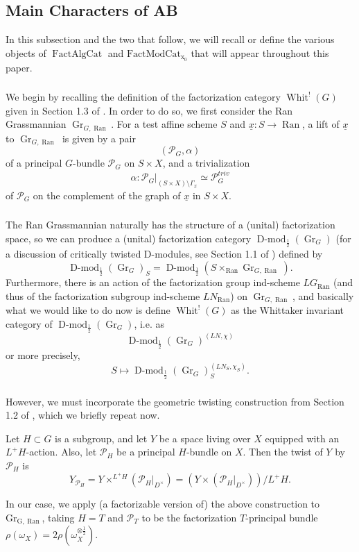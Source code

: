 \documentclass[10pt]{amsart}
\theoremstyle{remark}
\newcommand{\on}[1]{\operatorname{#1}}
\newcommand{\Dmod}{\on{D-mod}}
\newcommand{\FactAlgCat}{\on{FactAlgCat}}
\newcommand{\FactModCat}{\on{FactModCat_{x_0}}}
\newcommand{\sssec}[1]{\subsubsection{}}
\begin{document}
\subsection{Main Characters of AB} \label{Main Characters of AB}
In this subsection and the two that follow, we will recall or define the various objects of $\FactAlgCat$ and $\FactModCat$ that will appear throughout this paper.

\sssec{}
We begin by recalling the definition of the factorization category $\on{Whit}^!(G)$ given in Section 1.3 of \cite{GLC2}. In order to do so, we first consider the Ran Grassmannian $\on{Gr}_{G, \on{Ran}}$. For a test affine scheme $S$ and $\underline{x} : S \to \on{Ran}$, a lift of $\underline{x}$ to $\on{Gr}_{G, \on{Ran}}$ is given by a pair
$$
(\mathcal{P}_G, \alpha)
$$
of a principal $G$-bundle $\mathcal{P}_G$ on $S \times X$, and a trivialization
$$
\alpha: \mathcal{P}_G|_{(S \times X) \setminus \Gamma_{\underline{x}}} \simeq \mathcal{P}_G^{triv}
$$
of $\mathcal{P}_G$ on the complement of the graph of $\underline{x}$ in $S \times X$.

\sssec{}
The Ran Grassmannian naturally has the structure of a (unital) factorization space, so we can produce a (unital) factorization category $\Dmod_{\frac{1}{2}}(\on{Gr}_G)$ (for a discussion of critically twisted D-modules, see Section 1.1 of \cite{GLC2}) defined by
$$
    \Dmod_{\frac{1}{2}}(\on{Gr}_G)_S = \Dmod_{\frac{1}{2}}(S \times_{\on{Ran}} \on{Gr}_{G, \on{Ran}}).
$$
Furthermore, there is an action of the factorization group ind-scheme $LG_{\on{Ran}}$ (and thus of the factorization subgroup ind-scheme $LN_{\on{Ran}}$) on $\on{Gr}_{G, \on{Ran}}$, and basically what we would like to do now is define $\on{Whit}^!(G)$ as the Whittaker invariant category of $\Dmod_{\frac{1}{2}}(\on{Gr}_G)$, i.e. as
$$
\Dmod_{\frac{1}{2}}(\on{Gr}_G)^{(LN, \chi)}
$$
or more precisely,
$$
S \mapsto \Dmod_{\frac{1}{2}}(\on{Gr}_G)_S^{(LN_S, \chi_S)}.
$$

\sssec{}
However, we must incorporate the geometric twisting construction from Section 1.2 of \cite{GLC2}, which we briefly repeat now.

Let $H \subset G$ is a subgroup, and let $Y$ be a space living over $X$ equipped with an $L^+H$-action. Also, let $\mathcal{P}_H$ be a principal $H$-bundle on $X$. Then the twist of $Y$ by $\mathcal{P}_H$ is
$$
    Y_{\mathcal{P}_H} = Y \times^{L^+H} (\mathcal{P}_H|_{D^\times}) = (Y \times (\mathcal{P}_H|_{D^\times}))/L^+H.
$$

In our case, we apply (a factorizable version of) the above construction to $\on{Gr_{G, \on{Ran}}}$, taking $H = T$ and $\mathcal{P}_T$ to be the factorization $T$-principal bundle $\rho(\omega_X) = 2\rho(\omega_X^{\otimes \frac{1}{2}})$.
\end{document}
